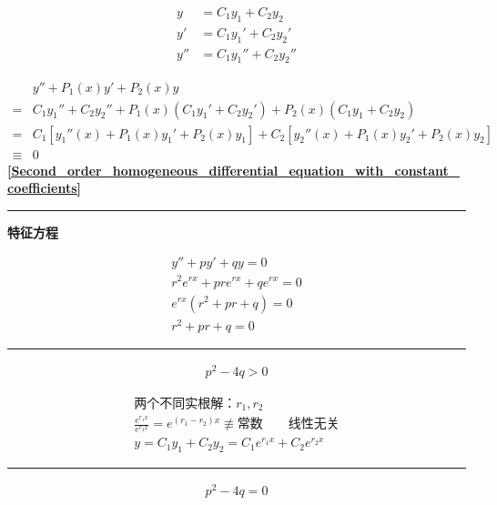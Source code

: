 \hfill
\vline
\begin{minipage}{.5\textwidth}
	\begin{align*}
	y&=C_1y_1+C_2y_2\\
	y'&=C_1y_1'+C_2y_2'\\
	y''&=C_1y_1''+C_2y_2''
	\end{align*}
\end{minipage}
\begin{align*}
	&y''+P_1(x)y'+P_2(x)y\\
	=&C_1y_1''+C_2y_2''+P_1(x)\left(C_1y_1'+C_2y_2'\right)+P_2(x)\left(C_1y_1+C_2y_2\right)\\
	=&C_1\left[y_1''(x)+P_1(x)y_1'+P_2(x)y_1\right]+C_2\left[y_2''(x)+P_1(x)y_2'+P_2(x)y_2\right]\\
	\equiv &0
\end{align*}
\textbf{\large \ref{Second_order_homogeneous_differential_equation_with_constant_coefficients}}\\
\noindent\rule[\fill]{\textwidth}{0.4pt}
\begin{minipage}{.2\textwidth}
	\centerline{\textbf{特征方程}}
\end{minipage}
\hfill
\vline
\begin{minipage}{.8\textwidth}
	\begin{align*}
		y''+py'+qy=0\\
		r^2e^{rx}+pre^{rx}+qe^{rx}=0\\
		e^{rx}(r^2+pr+q)=0\\
		r^2+pr+q=0
	\end{align*}
\end{minipage}
\noindent\rule[\fill]{\textwidth}{0.4pt}
\begin{minipage}{.2\textwidth}
	\begin{align*}
		p^2-4q>0
	\end{align*}
\end{minipage}
\hfill
\vline
\begin{minipage}{.8\textwidth}
	\begin{align*}
		\mbox{两个不同实根解：}r_1,r_2\\
		\frac{e^{r_1x}}{e^{r_2x}}=e^{(r_1-r_2)x}\not\equiv\mbox{常数}\qquad\mbox{线性无关}\\
		y=C_1y_1+C_2y_2=C_1e^{r_1x}+C_2e^{r_2x}
	\end{align*}
\end{minipage}
\noindent\rule[\fill]{\textwidth}{0.4pt}
\begin{minipage}{.2\textwidth}
	\begin{align*}
		p^2-4q=0
	\end{align*}
\end{minipage}
